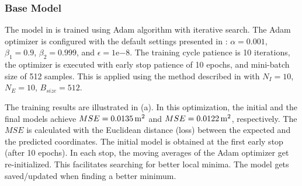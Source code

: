 \subsubsection{Base Model}
The model in  is trained using Adam algorithm with iterative search. The Adam optimizer is configured with the default settings presented in \cite{kingma2014adam}: $\alpha = 0.001$, $\beta_1 = 0.9$, $\beta_2 = 0.999$, and $\epsilon = 1\mathrm{e}{-8}$. The training cycle patience is 10 iterations, the optimizer is executed with early stop patience of 10 epochs, and mini-batch size of 512 samples. This is applied using the method described in  with $N_I = 10$, $N_E=10$, $B_{size}=512$.

The training results are illustrated in (a). In this optimization, the initial and the final models achieve $MSE=\unit[0.0135]{m^2}$ and $MSE=\unit[0.0122]{m^2}$, respectively. The $MSE$ is calculated with the Euclidean distance (loss) between the expected and the predicted coordinates. The initial model is obtained at the first early stop (after 10 epochs). In each stop, the moving averages of the Adam optimizer get re-initialized. This facilitates searching for better local minima. The model gets saved/updated when finding a better minimum.

